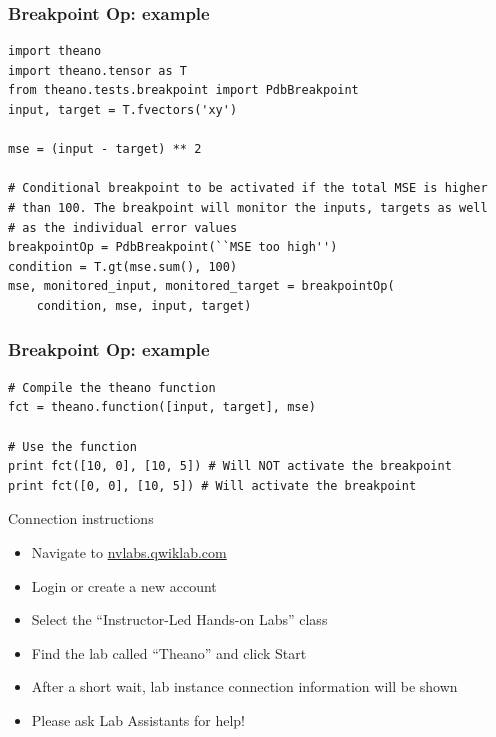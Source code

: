 \documentclass[utf8x,xcolor=pdftex,dvipsnames,table]{beamer}
\begin{document}
\begin{frame}[fragile]
  \frametitle{Breakpoint Op: example}
\begin{lstlisting}
import theano
import theano.tensor as T
from theano.tests.breakpoint import PdbBreakpoint
input, target = T.fvectors('xy')

mse = (input - target) ** 2

# Conditional breakpoint to be activated if the total MSE is higher
# than 100. The breakpoint will monitor the inputs, targets as well
# as the individual error values
breakpointOp = PdbBreakpoint(``MSE too high'')
condition = T.gt(mse.sum(), 100)
mse, monitored_input, monitored_target = breakpointOp(
    condition, mse, input, target)
\end{lstlisting}
\end{frame}

\begin{frame}[fragile]
  \frametitle{Breakpoint Op: example}
\begin{lstlisting}
# Compile the theano function
fct = theano.function([input, target], mse)

# Use the function
print fct([10, 0], [10, 5]) # Will NOT activate the breakpoint
print fct([0, 0], [10, 5]) # Will activate the breakpoint
\end{lstlisting}

\end{frame}

\begin{frame}{Connection instructions}
\begin{itemize}
\item Navigate to \url{nvlabs.qwiklab.com}
\item Login or create a new account
\item Select the ``Instructor-Led Hands-on Labs'' class
\item Find the lab called ``Theano'' and click Start
\item After a short wait, lab instance connection information will be shown
\item Please ask Lab Assistants for help!
\end{itemize}
\end{frame}
\end{document}
